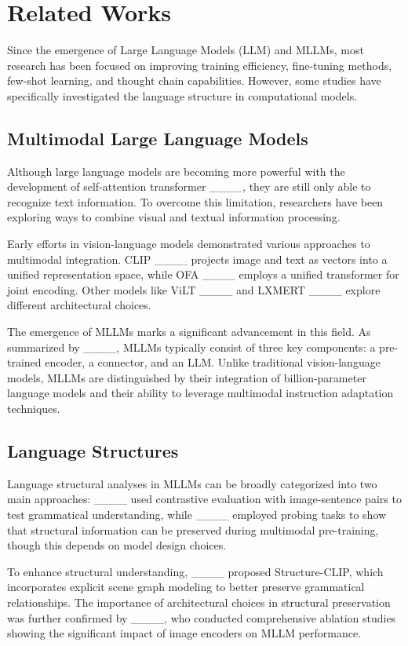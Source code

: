 \section{Related Works}
Since the emergence of Large Language Models (LLM) and MLLMs, most research has been focused on improving training efficiency, fine-tuning methods, few-shot learning, and thought chain capabilities. However, some studies have specifically investigated the language structure in computational models. 

\subsection{Multimodal Large Language Models}
Although large language models are becoming more powerful with the development of self-attention transformer ____, they are still only able to recognize text information. To overcome this limitation, researchers have been exploring ways to combine visual and textual information processing.

Early efforts in vision-language models demonstrated various approaches to multimodal integration. CLIP ____ projects image and text as vectors into a unified representation space, while OFA ____ employs a unified transformer for joint encoding. Other models like ViLT ____ and LXMERT ____ explore different architectural choices.

The emergence of MLLMs marks a significant advancement in this field. As summarized by ____, MLLMs typically consist of three key components: a pre-trained encoder, a connector, and an LLM. Unlike traditional vision-language models, MLLMs are distinguished by their integration of billion-parameter language models and their ability to leverage multimodal instruction adaptation techniques. 

\subsection{Language Structures}
Language structural analyses in MLLMs can be broadly categorized into two main approaches: ____ used contrastive evaluation with image-sentence pairs to test grammatical understanding, while ____ employed probing tasks to show that structural information can be preserved during multimodal pre-training, though this depends on model design choices.

To enhance structural understanding, ____ proposed Structure-CLIP, which incorporates explicit scene graph modeling to better preserve grammatical relationships. The importance of architectural choices in structural preservation was further confirmed by ____, who conducted comprehensive ablation studies showing the significant impact of image encoders on MLLM performance.

